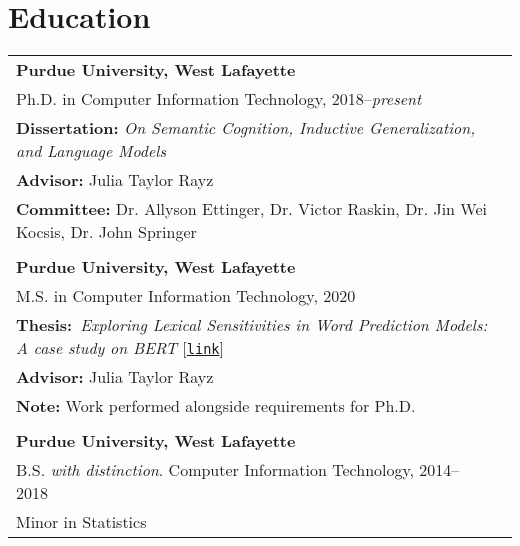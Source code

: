 \documentclass[11pt]{article}
\begin{document}
\section*{Education}
\begin{tabularx}{\textwidth}{@{}p{\textwidth}l}
\textbf{Purdue University, West Lafayette}\\
Ph.D. in Computer Information Technology, 2018--\textit{present}\\
\textbf{Dissertation:} \textit{On Semantic Cognition, Inductive Generalization, and Language Models}\\
\textbf{Advisor:} Julia Taylor Rayz\\
\textbf{Committee:} Dr. Allyson Ettinger, Dr. Victor Raskin, Dr. Jin Wei Kocsis, Dr. John Springer\\\\
\textbf{Purdue University, West Lafayette}\\
M.S. in Computer Information Technology, 2020\\
\textbf{Thesis:}~\textit{Exploring Lexical Sensitivities in Word Prediction Models: A case study on BERT} [\href{https://hammer.figshare.com/articles/thesis/Exploring_Lexical_Sensitivities_in_Word_Prediction_Models_A_case_study_on_BERT/13308830}{\texttt{link}}]\\
\textbf{Advisor:} Julia Taylor Rayz\\
\textbf{Note:} Work performed alongside requirements for Ph.D.\\\\

\textbf{Purdue University, West Lafayette}\\
B.S. \textit{with distinction}. Computer Information Technology, 2014--2018\\
Minor in Statistics
\end{tabularx}
\end{document}
